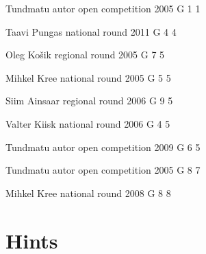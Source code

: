\documentclass[11pt]{article}
\begin{document}
\ylDisplay{} %
{Tundmatu autor} %
{open competition} %
{2005} %
{G 1} %
{1} %
{

\ifEngStatement
\fi
}

\ylDisplay{} %
{Taavi Pungas} %
{national round} %
{2011} %
{G 4} %
{4} %
{

\ifEngStatement
\fi
}

\ylDisplay{} %
{Oleg Košik} %
{regional round} %
{2005} %
{G 7} %
{5} %
{

\ifEngStatement
\fi
}

\ylDisplay{} %
{Mihkel Kree} %
{national round} %
{2005} %
{G 5} %
{5} %
{

\ifEngStatement
\fi
}

\ylDisplay{} %
{Siim Ainsaar} %
{regional round} %
{2006} %
{G 9} %
{5} %
{

\ifEngStatement
\fi
}

\ylDisplay{} %
{Valter Kiisk} %
{national round} %
{2006} %
{G 4} %
{5} %
{

\ifEngStatement
\fi
}

\ylDisplay{} %
{Tundmatu autor} %
{open competition} %
{2009} %
{G 6} %
{5} %
{

\ifEngStatement
\fi
}

\ylDisplay{} %
{Tundmatu autor} %
{open competition} %
{2005} %
{G 8} %
{7} %
{

\ifEngStatement
\fi
}

\ylDisplay{} %
{Mihkel Kree} %
{national round} %
{2008} %
{G 8} %
{8} %
{

\ifEngStatement
\fi
}
\newpage\normalsize\section{Hints}
        \ToggleEngHint
        
\end{document}
